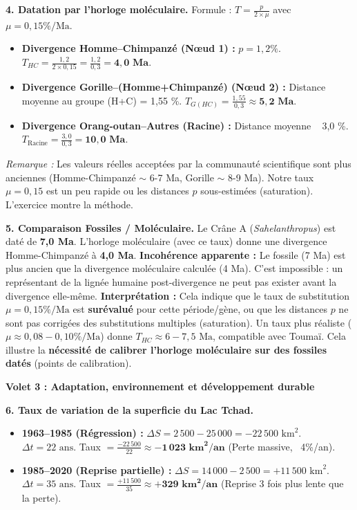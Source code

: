\documentclass[11pt]{article}
\begin{document}
\begin{exoresolu}
\textbf{4. Datation par l'horloge moléculaire.}
Formule : $T = \frac{p}{2 \times \mu}$ avec $\mu = 0,15 \%\text{/Ma}$.
\begin{itemize}
    \item \textbf{Divergence Homme--Chimpanzé (Nœud 1) :} $p = 1,2 \%$.
    $T_{HC} = \frac{1,2}{2 \times 0,15} = \frac{1,2}{0,3} = \mathbf{4,0 \text{ Ma}}$.
    \item \textbf{Divergence Gorille--(Homme+Chimpanzé) (Nœud 2) :} Distance moyenne au groupe (H+C) = 1,55 \%.
    $T_{G(HC)} = \frac{1,55}{0,3} \approx \mathbf{5,2 \text{ Ma}}$.
    \item \textbf{Divergence Orang-outan--Autres (Racine) :} Distance moyenne ~ 3,0 \%.
    $T_{\text{Racine}} = \frac{3,0}{0,3} = \mathbf{10,0 \text{ Ma}}$.
\end{itemize}
\emph{Remarque :} Les valeurs réelles acceptées par la communauté scientifique sont plus anciennes (Homme-Chimpanzé $\sim$ 6-7 Ma, Gorille $\sim$ 8-9 Ma). Notre taux $\mu = 0,15$ est un peu rapide ou les distances $p$ sous-estimées (saturation). L'exercice montre la méthode.

\textbf{5. Comparaison Fossiles / Moléculaire.}
Le Crâne A (\emph{Sahelanthropus}) est daté de \textbf{7,0 Ma}. L'horloge moléculaire (avec ce taux) donne une divergence Homme-Chimpanzé à \textbf{4,0 Ma}.
\textbf{Incohérence apparente :} Le fossile (7 Ma) est plus ancien que la divergence moléculaire calculée (4 Ma). C'est impossible : un représentant de la lignée humaine post-divergence ne peut pas exister avant la divergence elle-même.
\textbf{Interprétation :} Cela indique que le taux de substitution $\mu = 0,15 \%\text{/Ma}$ est \textbf{surévalué} pour cette période/gène, ou que les distances $p$ ne sont pas corrigées des substitutions multiples (saturation). Un taux plus réaliste ($\mu \approx 0,08 - 0,10 \%\text{/Ma}$) donne $T_{HC} \approx 6-7,5 \text{ Ma}$, compatible avec Toumaï. Cela illustre la \textbf{nécessité de calibrer l'horloge moléculaire sur des fossiles datés} (points de calibration).

\textbf{Volet 3 : Adaptation, environnement et développement durable}

\textbf{6. Taux de variation de la superficie du Lac Tchad.}
\begin{itemize}
    \item \textbf{1963--1985 (Régression) :} $\Delta S = 2\,500 - 25\,000 = -22\,500 \text{ km}^2$. $\Delta t = 22 \text{ ans}$.
    Taux $= \frac{-22\,500}{22} \approx \mathbf{-1\,023 \text{ km}^2/\text{an}}$ (Perte massive, ~4\%/an).
    \item \textbf{1985--2020 (Reprise partielle) :} $\Delta S = 14\,000 - 2\,500 = +11\,500 \text{ km}^2$. $\Delta t = 35 \text{ ans}$.
    Taux $= \frac{+11\,500}{35} \approx \mathbf{+329 \text{ km}^2/\text{an}}$ (Reprise 3 fois plus lente que la perte).
\end{itemize}


\end{exoresolu}
\end{document}
